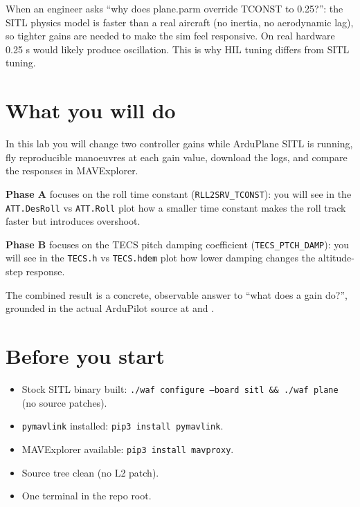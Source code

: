 \documentclass[a4paper,11pt,twoside]{article}
\renewcommand{\instadvanced}[1]{\ifinstructor\begin{tcolorbox}[colback=violet!5!white,colframe=violet!50!black,title=Advanced material pointer,breakable]#1\end{tcolorbox}\fi}
\begin{document}
\instadvanced{When an engineer asks ``why does plane.parm override TCONST to 0.25?'': the SITL physics model is faster than a real aircraft (no inertia, no aerodynamic lag), so tighter gains are needed to make the sim feel responsive. On real hardware 0.25 s would likely produce oscillation. This is why HIL tuning differs from SITL tuning.}

\else

\section*{What you will do}

In this lab you will change two controller gains while ArduPlane SITL is running, fly reproducible manoeuvres at each gain value, download the logs, and compare the responses in MAVExplorer.

\textbf{Phase A} focuses on the roll time constant (\texttt{RLL2SRV\_TCONST}): you will see in the \texttt{ATT.DesRoll} vs \texttt{ATT.Roll} plot how a smaller time constant makes the roll track faster but introduces overshoot.

\textbf{Phase B} focuses on the TECS pitch damping coefficient (\texttt{TECS\_PTCH\_DAMP}): you will see in the \texttt{TECS.h} vs \texttt{TECS.hdem} plot how lower damping changes the altitude-step response.

The combined result is a concrete, observable answer to ``what does a gain do?'', grounded in the actual ArduPilot source at  and .

\section*{Before you start}

\begin{itemize}
  \item Stock SITL binary built: \texttt{./waf configure --board sitl \&\& ./waf plane} (no source patches).
  \item \texttt{pymavlink} installed: \texttt{pip3 install pymavlink}.
  \item MAVExplorer available: \texttt{pip3 install mavproxy}.
  \item Source tree clean (no L2 patch).
  \item One terminal in the repo root.
\end{itemize}
\end{document}
